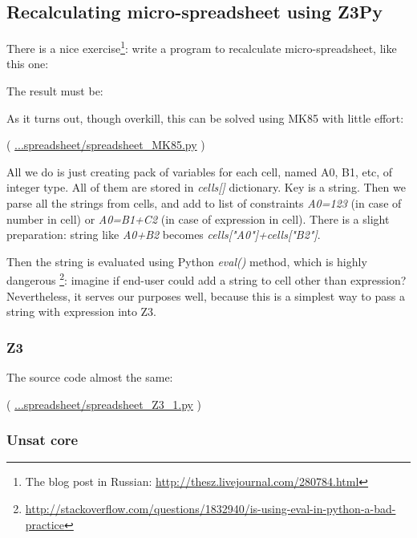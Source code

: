 \subsection{Recalculating micro-spreadsheet using Z3Py}

\renewcommand{\CURPATH}{equations/spreadsheet}

There is a nice exercise\footnote{The blog post in Russian: \url{http://thesz.livejournal.com/280784.html}}:
write a program to recalculate micro-spreadsheet, like this one:



The result must be:



As it turns out, though overkill, this can be solved using MK85 with little effort:



( \url{...spreadsheet/spreadsheet_MK85.py} )

All we do is just creating pack of variables for each cell, named A0, B1, etc, of integer type.
All of them are stored in \textit{cells[]} dictionary.
Key is a string.
Then we parse all the strings from cells, and add to list of constraints \textit{A0=123}
(in case of number in cell) or \textit{A0=B1+C2} (in case of expression in cell).
There is a slight preparation: string like \textit{A0+B2} becomes \textit{cells["A0"]+cells["B2"]}.

Then the string is evaluated using Python \textit{eval()} method,
which is highly dangerous
\footnote{\url{http://stackoverflow.com/questions/1832940/is-using-eval-in-python-a-bad-practice}}:
imagine if end-user could add a string to cell other than expression?
Nevertheless, it serves our purposes well, because this is a simplest way to pass a string with expression into Z3.

\subsubsection{Z3}

The source code almost the same:



( \url{...spreadsheet/spreadsheet_Z3_1.py} )

\subsubsection{Unsat core}

